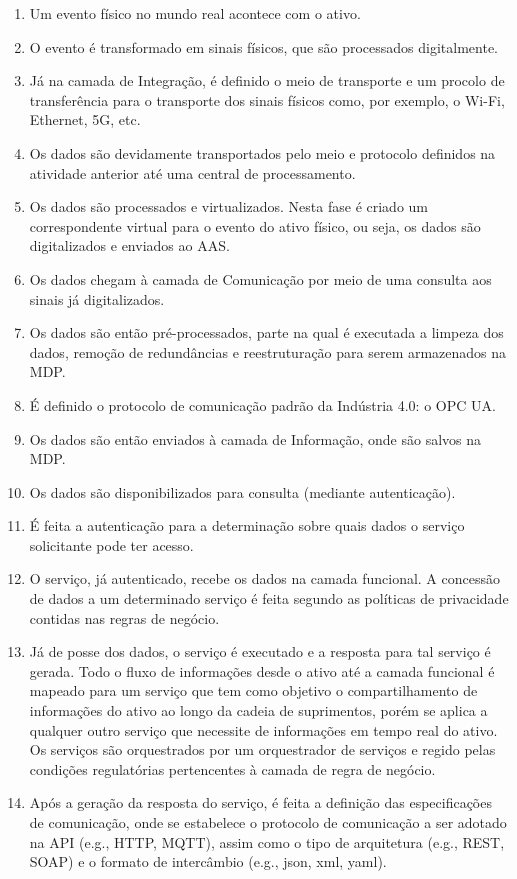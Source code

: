 	\begin{enumerate}
		\item Um evento físico no mundo real acontece com o ativo.
		\item O evento é transformado em sinais físicos, que são processados digitalmente.
		\item Já na camada de Integração, é definido o meio de transporte e um procolo de transferência para o transporte dos sinais físicos como, por exemplo, o Wi-Fi, Ethernet, 5G, etc.
		\item Os dados são devidamente transportados pelo meio e protocolo definidos na atividade anterior até uma central de processamento.
		\item Os dados são processados e virtualizados. Nesta fase é criado um correspondente virtual para o evento do ativo físico, ou seja, os dados são digitalizados e enviados ao AAS.
		\item Os dados chegam à camada de Comunicação por meio de uma consulta aos sinais já digitalizados.
		\item Os dados são então pré-processados, parte na qual é executada a limpeza dos dados, remoção de redundâncias e reestruturação para serem armazenados na MDP.
		\item É definido o protocolo de comunicação padrão da Indústria 4.0: o OPC UA.
		\item Os dados são então enviados à camada de Informação, onde são salvos na MDP.
		\item Os dados são disponibilizados para consulta (mediante autenticação).
		\item É feita a autenticação para a determinação sobre quais dados o serviço solicitante pode ter acesso.
		\item O serviço, já autenticado, recebe os dados na camada funcional. A concessão de dados a um determinado serviço é feita segundo as políticas de privacidade contidas nas regras de negócio.
		\item Já de posse dos dados, o serviço é executado e a resposta para tal serviço é gerada. Todo o fluxo de informações desde o ativo até a camada funcional é mapeado para um serviço que tem como objetivo o compartilhamento de informações do ativo ao longo da cadeia de suprimentos, porém se aplica a qualquer outro serviço que necessite de informações em tempo real do ativo. Os serviços são orquestrados por um orquestrador de serviços e regido pelas condições regulatórias pertencentes à camada de regra de negócio.
		\item Após a geração da resposta do serviço, é feita a definição das especificações de comunicação, onde se estabelece o protocolo de comunicação a ser adotado na API (e.g., HTTP, MQTT), assim como o tipo de arquitetura (e.g., REST, SOAP) e o formato de intercâmbio (e.g., json, xml, yaml).

\end{enumerate}
